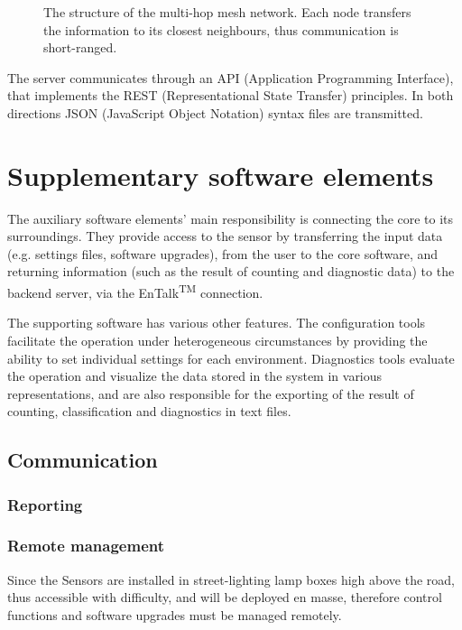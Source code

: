 \begin{figure}[!h]
	\centering
	
	\caption{The structure of the multi-hop mesh network. Each node transfers the information to its closest neighbours, thus communication is short-ranged. \label{fig:network}}
\end{figure}

The server communicates through an API (Application Programming Interface), that implements the REST (Representational State Transfer) principles. 
In both directions JSON (JavaScript Object Notation) syntax files are transmitted.
\section{Supplementary software elements}\label{sec:SupplementarySoftware}
The auxiliary software elements' main responsibility is connecting the core to its surroundings.
They provide access to the sensor by transferring the input data (e.g. settings files, software upgrades), from the user to the core software, and returning information (such as the result of counting and diagnostic data) to the backend server, via the EnTalk\textsuperscript{TM} connection.

The supporting software has various other features.
The configuration tools facilitate the operation under heterogeneous circumstances by providing the ability to set individual settings for each environment.
Diagnostics tools evaluate the operation and visualize the data stored in the system in various representations, and are also responsible for the exporting of the result of counting, classification and diagnostics in text files.
\subsection{Communication}
\subsubsection{Reporting}


\subsubsection{Remote management}
Since the Sensors are installed in street-lighting lamp boxes high above the road, thus accessible with difficulty, and will be deployed en masse, therefore control functions and software upgrades must be managed remotely.

